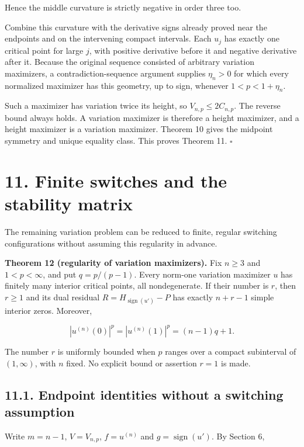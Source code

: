 \documentclass[11pt]{article}
\begin{document}
Hence the middle curvature is strictly negative in order three too.

Combine this curvature with the derivative signs already proved near the
endpoints and on the intervening compact intervals. Each \(u_j\) has
exactly one critical point for large \(j\), with positive derivative
before it and negative derivative after it. Because the original
sequence consisted of arbitrary variation maximizers, a
contradiction-sequence argument supplies \(\eta_n>0\) for which every
normalized maximizer has this geometry, up to sign, whenever
\(1<p<1+\eta_n\).

Such a maximizer has variation twice its height, so
\(V_{n,p}\le2C_{n,p}\). The reverse bound always holds. A variation
maximizer is therefore a height maximizer, and a height maximizer is a
variation maximizer. Theorem 10 gives the midpoint symmetry and unique
equality class. This proves Theorem 11. \(\square\)

\section{11. Finite switches and the stability
matrix}\label{finite-switches-and-the-stability-matrix}

The remaining variation problem can be reduced to finite, regular
switching configurations without assuming this regularity in advance.

\textbf{Theorem 12 (regularity of variation maximizers).} Fix \(n\ge3\)
and \(1<p<\infty\), and put \(q=p/(p-1)\). Every norm-one variation
maximizer \(u\) has finitely many interior critical points, all
nondegenerate. If their number is \(r\), then \(r\ge1\) and its dual
residual \(R=H_{\operatorname{sign}(u')}-P\) has exactly \(n+r-1\)
simple interior zeros. Moreover,

\[
|u^{(n)}(0)|^p=|u^{(n)}(1)|^p=(n-1)q+1.
\tag{11.1}
\]

The number \(r\) is uniformly bounded when \(p\) ranges over a compact
subinterval of \((1,\infty)\), with \(n\) fixed. No explicit bound or
assertion \(r=1\) is made.

\subsection{11.1. Endpoint identities without a switching
assumption}\label{endpoint-identities-without-a-switching-assumption}

Write \(m=n-1\), \(V=V_{n,p}\), \(f=u^{(n)}\) and
\(g=\operatorname{sign}(u')\). By Section 6,
\end{document}

